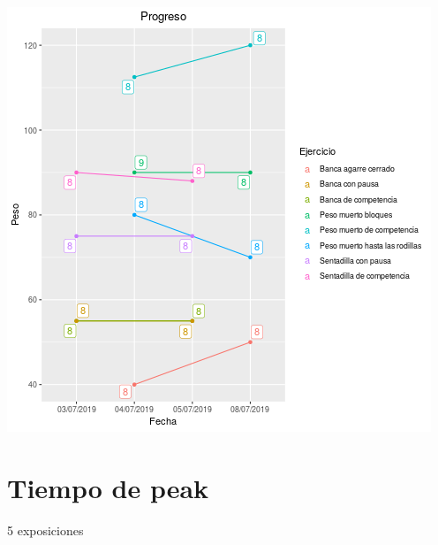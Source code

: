 \documentclass[11pt]{article}
\begin{document}
\begin{center}
\includegraphics[width=.9\linewidth]{tmp.png}
\end{center}

\section{Tiempo de peak}
\label{sec:org187169e}
5 exposiciones
\end{document}
